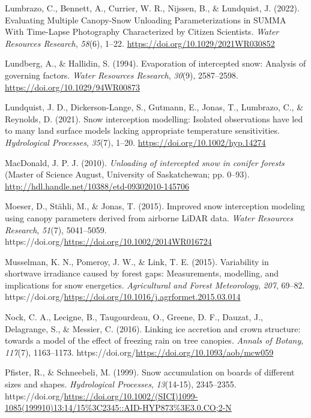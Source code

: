 \documentclass[
  letterpaper,
  DIV=11,
  numbers=noendperiod]{scrartcl}
\newlength{\cslhangindent}
\newenvironment{CSLReferences}[2] %
 {\begin{list}{}{%
  \setlength{\itemindent}{0pt}
  \setlength{\leftmargin}{0pt}
  \setlength{\parsep}{0pt}
  \ifodd #1
   \setlength{\leftmargin}{\cslhangindent}
   \setlength{\itemindent}{-1\cslhangindent}
  \fi
  \setlength{\itemsep}{#2\baselineskip}}}
 {\end{list}}
\begin{document}
\begin{CSLReferences}{1}{0}
Lumbrazo, C., Bennett, A., Currier, W. R., Nijssen, B., \& Lundquist, J.
(2022). {Evaluating Multiple Canopy-Snow Unloading Parameterizations in
SUMMA With Time-Lapse Photography Characterized by Citizen Scientists}.
\emph{Water Resources Research}, \emph{58}(6), 1--22.
\url{https://doi.org/10.1029/2021WR030852}

Lundberg, A., \& Hallidin, S. (1994). {Evaporation of intercepted snow:
Analysis of governing factors}. \emph{Water Resources Research},
\emph{30}(9), 2587--2598. \url{https://doi.org/10.1029/94WR00873}

Lundquist, J. D., Dickerson-Lange, S., Gutmann, E., Jonas, T., Lumbrazo,
C., \& Reynolds, D. (2021). {Snow interception modelling: Isolated
observations have led to many land surface models lacking appropriate
temperature sensitivities}. \emph{Hydrological Processes}, \emph{35}(7),
1--20. \url{https://doi.org/10.1002/hyp.14274}

MacDonald, J. P. J. (2010). \emph{{Unloading of intercepted snow in
conifer forests}} (Master of Science August, University of Saskatchewan;
pp. 0--93). \url{http://hdl.handle.net/10388/etd-09302010-145706}

Moeser, D., Stähli, M., \& Jonas, T. (2015). {Improved snow interception
modeling using canopy parameters derived from airborne LiDAR data}.
\emph{Water Resources Research}, \emph{51}(7), 5041--5059.
https://doi.org/\url{https://doi.org/10.1002/2014WR016724}

Musselman, K. N., Pomeroy, J. W., \& Link, T. E. (2015). {Variability in
shortwave irradiance caused by forest gaps: Measurements, modelling, and
implications for snow energetics}. \emph{Agricultural and Forest
Meteorology}, \emph{207}, 69--82.
https://doi.org/\url{https://doi.org/10.1016/j.agrformet.2015.03.014}

Nock, C. A., Lecigne, B., Taugourdeau, O., Greene, D. F., Dauzat, J.,
Delagrange, S., \& Messier, C. (2016). {Linking ice accretion and crown
structure: towards a model of the effect of freezing rain on tree
canopies}. \emph{Annals of Botany}, \emph{117}(7), 1163--1173.
https://doi.org/\url{https://doi.org/10.1093/aob/mcw059}

Pfister, R., \& Schneebeli, M. (1999). {Snow accumulation on boards of
different sizes and shapes}. \emph{Hydrological Processes},
\emph{13}(14-15), 2345--2355.
https://doi.org/\url{https://doi.org/10.1002/(SICI)1099-1085(199910)13:14/15\%3C2345::AID-HYP873\%3E3.0.CO;2-N}


\end{CSLReferences}
\end{document}
